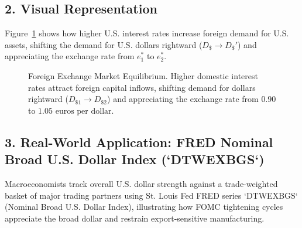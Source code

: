 \documentclass[11pt,letterpaper]{article}
\begin{document}
\subsection*{2. Visual Representation}
Figure~\ref{fig:fx_market_appreciation} shows how higher U.S. interest rates increase foreign demand for U.S. assets, shifting the demand for U.S. dollars rightward ($D_{\$} \to D_{\$}'$) and appreciating the exchange rate from $e_1^*$ to $e_2^*$.

\begin{figure}[htbp]
\centering
{}
\caption{Foreign Exchange Market Equilibrium. Higher domestic interest rates attract foreign capital inflows, shifting demand for dollars rightward ($D_{\$1} \to D_{\$2}$) and appreciating the exchange rate from $0.90$ to $1.05\text{ euros per dollar}$.}
\label{fig:fx_market_appreciation}
\end{figure}

\subsection*{3. Real-World Application: FRED Nominal Broad U.S. Dollar Index (`DTWEXBGS`)}
Macroeconomists track overall U.S. dollar strength against a trade-weighted basket of major trading partners using St. Louis Fed FRED series `DTWEXBGS` (Nominal Broad U.S. Dollar Index), illustrating how FOMC tightening cycles appreciate the broad dollar and restrain export-sensitive manufacturing.
\end{document}
